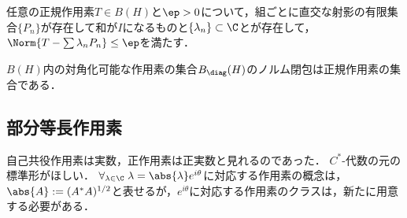 \documentclass[uplatex,dvipdfmx]{jsreport}
\begin{document}
\begin{lemma}
    任意の正規作用素$T\in B(H)$と$\ep>0$について，組ごとに直交な射影の有限集合$\{P_n\}$が存在して和が$I$になるものと$\{\lambda_n\}\subset\C$とが存在して，$\Norm{T-\sum\lambda_nP_n}\le\ep$を満たす．
\end{lemma}

\begin{theorem}
    $B(H)$内の対角化可能な作用素の集合$B_\diag(H)$のノルム閉包は正規作用素の集合である．
\end{theorem}

\subsection{部分等長作用素}

\begin{tcolorbox}[colframe=ForestGreen, colback=ForestGreen!10!white,breakable,colbacktitle=ForestGreen!40!white,coltitle=black,fonttitle=\bfseries\sffamily,
title=]
    自己共役作用素は実数，正作用素は正実数と見れるのであった．
    $C^*$-代数の元の標準形がほしい．
    $\forall_{\lambda\in\C}\;\lambda=\abs{\lambda}e^{i\theta}$に対応する作用素の概念は，$\abs{A}:=(A^*A)^{1/2}$と表せるが，$e^{i\theta}$に対応する作用素のクラスは，新たに用意する必要がある．
\end{tcolorbox}
\end{document}
